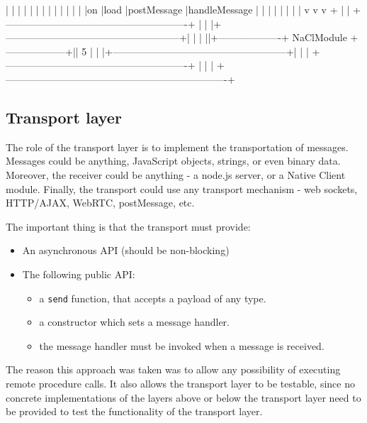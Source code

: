\begin{code}
|         |        |       |                |                       |
|         |        |       |                |                       |
|         |on      |load   |postMessage     |handleMessage          |
|         |        |       |                |                       |
|         v        v       v                +                       |
|     +-------------------------------------------------------+     |
|     |+-----------------------------------------------------+|     |
|     ||+-------------------+ NaClModule +------------------+|| 5   |
|     |+-----------------------------------------------------+|     |
|     +-------------------------------------------------------+     |
|                                                                   |
+-------------------------------------------------------------------+
\end{code}


\subsection{Transport layer} %
\label{sub:transport_layer_design}
The role of the transport layer is to implement the transportation of messages. Messages could be anything, JavaScript objects, strings, or even binary data. Moreover, the receiver could be anything - a node.js server, or a Native Client module. Finally, the transport could use any transport mechanism - web sockets, HTTP/AJAX, WebRTC, postMessage, etc.

The important thing is that the transport must provide:
\begin{itemize}
	\item An asynchronous API (should be non-blocking)
	\item The following public API:
	\begin{itemize}
		\item a \lstinline+send+ function, that accepts a payload of any type.
		\item a constructor which sets a message handler.
		\item the message handler must be invoked when a message is received. 
	\end{itemize}
\end{itemize}

The reason this approach was taken was to allow any possibility of executing remote procedure calls. It also allows the transport layer to be testable, since no concrete implementations of the layers above or below the transport layer need to be provided to test the functionality of the transport layer.


